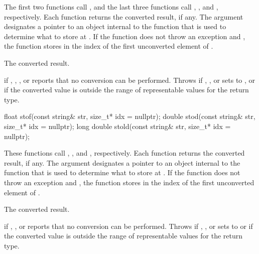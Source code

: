 \begin{itemdescr}
\pnum
\effects
The first two functions call ,
and the last three functions call ,
, and , respectively. Each function returns the converted result, if any. The
argument  designates a pointer to an object internal to the function
that is used to determine what to store at . If the function does
not throw an exception and , the function stores in 
the index of the first unconverted element of .

\pnum
\returns
The converted result.

\pnum
\throws
{} if , ,
, or  reports that no conversion can be
performed. Throws  if , ,
 or  sets  to ,
or if the converted value is outside the range of representable values
for the return type.
\end{itemdescr}

%
%
%
\begin{itemdecl}
float stof(const string& str, size_t* idx = nullptr);
double stod(const string& str, size_t* idx = nullptr);
long double stold(const string& str, size_t* idx = nullptr);
\end{itemdecl}

\begin{itemdescr}
\pnum
\effects
These functions call
, , and
, respectively. Each function returns
the converted result, if any. The argument  designates a pointer to
an object internal to the function that is used to determine what to store at
. If the function does not throw an exception and ,
the function stores in  the index of the first unconverted element
of .

\pnum
\returns
The converted result.

\pnum
\throws
{} if , , or
 reports that no conversion can be performed. Throws
 if , , or
 sets  to 
or if the converted value is outside the range of representable
values for the return type.
\end{itemdescr}

